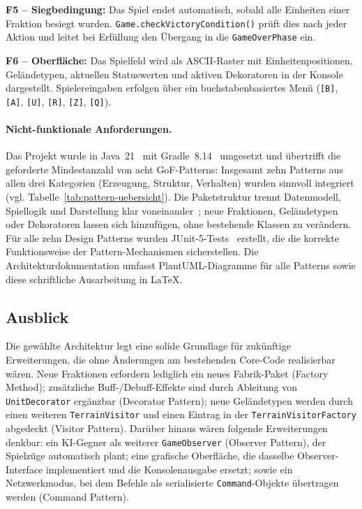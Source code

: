 \textbf{F5 – Siegbedingung:} Das Spiel endet automatisch, sobald alle Einheiten einer Fraktion besiegt wurden.
\texttt{Game.checkVictoryCondition()} prüft dies nach jeder Aktion und leitet bei Erfüllung den Übergang in die \texttt{GameOverPhase} ein.

\textbf{F6 – Oberfläche:} Das Spielfeld wird als ASCII-Raster mit Einheitenpositionen, Geländetypen, aktuellen Statuswerten und aktiven Dekoratoren in der Konsole dargestellt.
Spielereingaben erfolgen über ein buchstabenbasiertes Menü (\texttt{[B]}, \texttt{[A]}, \texttt{[U]}, \texttt{[R]}, \texttt{[Z]}, \texttt{[Q]}).

\paragraph{Nicht-funktionale Anforderungen.}
Das Projekt wurde in Java~21~\cite{java21} mit Gradle~8.14~\cite{gradle} umgesetzt und übertrifft die geforderte Mindestanzahl von acht GoF-Patterns: Insgesamt zehn Patterns aus allen drei Kategorien (Erzeugung, Struktur, Verhalten) wurden sinnvoll integriert (vgl. Tabelle~\ref{tab:pattern-uebersicht}).
Die Paketstruktur trennt Datenmodell, Spiellogik und Darstellung klar voneinander~\cite{cleancode}; neue Fraktionen, Geländetypen oder Dekoratoren lassen sich hinzufügen, ohne bestehende Klassen zu verändern.
Für alle zehn Design Patterns wurden JUnit-5-Tests~\cite{junit5} erstellt, die die korrekte Funktionsweise der Pattern-Mechanismen sicherstellen.
Die Architekturdokumentation umfasst PlantUML-Diagramme für alle Patterns sowie diese schriftliche Ausarbeitung in \LaTeX.

\subsection{Ausblick}
\label{sec:ausblick}

Die gewählte Architektur legt eine solide Grundlage für zukünftige Erweiterungen, die ohne Änderungen am bestehenden Core-Code realisierbar wären.
Neue Fraktionen erfordern lediglich ein neues Fabrik-Paket (Factory Method); zusätzliche Buff-/Debuff-Effekte sind durch Ableitung von \texttt{UnitDecorator} ergänzbar (Decorator Pattern); neue Geländetypen werden durch einen weiteren \texttt{TerrainVisitor} und einen Eintrag in der \texttt{TerrainVisitorFactory} abgedeckt (Visitor Pattern).
Darüber hinaus wären folgende Erweiterungen denkbar: ein KI-Gegner als weiterer \texttt{GameObserver} (Observer Pattern), der Spielzüge automatisch plant; eine grafische Oberfläche, die dasselbe Observer-Interface implementiert und die Konsolenausgabe ersetzt; sowie ein Netzwerkmodus, bei dem Befehle als serialisierte \texttt{Command}-Objekte übertragen werden (Command Pattern).

